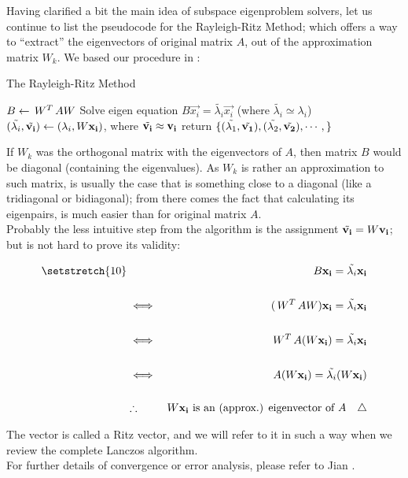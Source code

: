 Having clarified a bit the main idea of subspace eigenproblem solvers,
let us continue to list the pseudocode for the Rayleigh-Ritz Method; which
offers a way to ``extract'' the eigenvectors of original matrix $A$,
out of the approximation matrix $W_k$. We based our procedure in
\cite{jia01}: 

\begin{algorithm}
  \label{alg:ritz}
  \caption{The Rayleigh-Ritz Method}
%
  \DontPrintSemicolon
%
%
%
    $B \gets \,{W}^{T}\, A W $ \;
%
    {
%
      Solve eigen equation $B\vec{x_i} = \tilde{\lambda_i} \vec{x_i}$ (where
      $\tilde{\lambda_i} \simeq \lambda_i$) \;
%
      $(\tilde{\lambda_i}, \tilde{\mathbf{v_i}}) \gets (\lambda_i, W\mathbf{x_i})$,
      where $\tilde{\mathbf{v_i}} \approx \mathbf{v_i}$ \;
    }
%
    return $\{(\tilde{\lambda_1},\tilde{\mathbf{v_1}}),(\tilde{\lambda_2},\tilde{\mathbf{v_2}}),\cdots,\}$ \;
\end{algorithm}

If $W_k$ was the orthogonal matrix with the eigenvectors of $A$, then
matrix $B$ would be diagonal (containing the eigenvalues). As $W_k$ is
rather an approximation to such matrix, is usually the case that is
something close to a diagonal (like a tridiagonal or bidiagonal); from
there comes the fact that calculating its eigenpairs, is much easier
than for original matrix $A$. \\

Probably the less intuitive step from the algorithm is the assignment
$\tilde{\mathbf{v_i}} = W\mathbf{v_i}$; but is not hard to prove its validity: 

\begin{align*}
\setstretch{10}
& &B\vec{x_i} = \tilde{\lambda_i} \vec{x_i} \\\\
& \iff &(\trans{W} A W)\vec{x_i} = \tilde{\lambda_i} \vec{x_i} \\\\
& \iff &\trans{W} A (W\vec{x_i}) = \tilde{\lambda_i} \vec{x_i} \\\\
& \iff &A (W\vec{x_i}) = \tilde{\lambda_i} (W \vec{x_i}) \\\\
& \therefore & W\vec{x_i} \text{ is an (approx.) eigenvector of $A$} \xqed
\end{align*}
\hfill

The vector  is called a Ritz vector, and we will refer to it
in such a way when we review the complete Lanczos algorithm.\\

For further details of convergence or error analysis, please refer to
Jian \cite{jia01}. 

